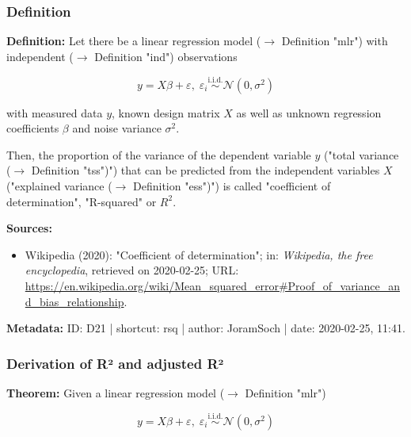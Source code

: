 \documentclass[a4paper,12pt]{book}
\begin{document}
\subsubsection[\textit{Definition}]{Definition} \label{sec:rsq}

\vspace{1em}
\textbf{Definition:} Let there be a linear regression model ($\rightarrow$ Definition "mlr") with independent ($\rightarrow$ Definition "ind") observations

\begin{equation} \label{eq:rsq-mlr}
y = X\beta + \varepsilon, \; \varepsilon_i \overset{\mathrm{i.i.d.}}{\sim} \mathcal{N}(0, \sigma^2)
\end{equation}

with measured data $y$, known design matrix $X$ as well as unknown regression coefficients $\beta$ and noise variance $\sigma^2$.

Then, the proportion of the variance of the dependent variable $y$ ("total variance ($\rightarrow$ Definition "tss")") that can be predicted from the independent variables $X$ ("explained variance ($\rightarrow$ Definition "ess")") is called "coefficient of determination", "R-squared" or $R^2$.

\vspace{1em}
\textbf{Sources:}
\begin{itemize}
\item Wikipedia (2020): "Coefficient of determination"; in: \textit{Wikipedia, the free encyclopedia}, retrieved on 2020-02-25; URL: \url{https://en.wikipedia.org/wiki/Mean_squared_error#Proof_of_variance_and_bias_relationship}.
\end{itemize}


\vspace{1em}
\textbf{Metadata:} ID: D21 | shortcut: rsq | author: JoramSoch | date: 2020-02-25, 11:41.


\subsubsection[\textbf{Derivation of R² and adjusted R²}]{Derivation of R² and adjusted R²} \label{sec:rsq-der}

\vspace{1em}
\textbf{Theorem:} Given a linear regression model ($\rightarrow$ Definition "mlr")

\begin{equation} \label{eq:rsq-der-rsq-mlr}
y = X\beta + \varepsilon, \; \varepsilon_i \overset{\mathrm{i.i.d.}}{\sim} \mathcal{N}(0, \sigma^2)
\end{equation}
\end{document}
